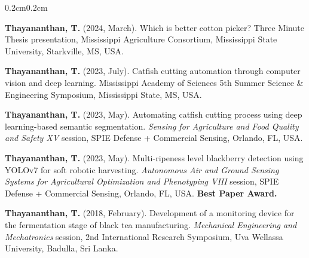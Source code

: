 \documentclass[10pt, letterpaper]{article}
\newcommand{\textbfr}[1]{\textbf{#1}}
\newenvironment{onecolentry}{%
    \begin{adjustwidth}{0.2cm}{0.2cm}
}{\end{adjustwidth}}
\newenvironment{pres}{%
  \begin{enumerate}[label={[P\arabic*]}, leftmargin=1.15cm, labelsep=0.2cm,
                    topsep=0.08cm, parsep=0.08cm, partopsep=0pt, itemsep=0pt]
}{\end{enumerate}}
\begin{document}
\begin{onecolentry}
\begin{pres}
    \item \textbfr{Thayananthan, T.} (2024, March). Which is better cotton picker?
    Three Minute Thesis presentation, Mississippi Agriculture Consortium,
    Mississippi State University, Starkville, MS, USA.

    \item \textbfr{Thayananthan, T.} (2023, July). Catfish cutting automation through
    computer vision and deep learning. Mississippi Academy of Sciences 5th Summer
    Science \& Engineering Symposium, Mississippi State, MS, USA.

    \item \textbfr{Thayananthan, T.} (2023, May). Automating catfish cutting process
    using deep learning-based semantic segmentation. \emph{Sensing for Agriculture
    and Food Quality and Safety XV} session, SPIE Defense + Commercial Sensing,
    Orlando, FL, USA.

    \item \textbfr{Thayananthan, T.} (2023, May). Multi-ripeness level blackberry
    detection using YOLOv7 for soft robotic harvesting. \emph{Autonomous Air and
    Ground Sensing Systems for Agricultural Optimization and Phenotyping VIII}
    session, SPIE Defense + Commercial Sensing, Orlando, FL, USA.
    \textbf{Best Paper Award.}

    \item \textbfr{Thayananthan, T.} (2018, February). Development of a monitoring
    device for the fermentation stage of black tea manufacturing.
    \emph{Mechanical Engineering and Mechatronics} session, 2nd International
    Research Symposium, Uva Wellassa University, Badulla, Sri Lanka.
\end{pres}
\end{onecolentry}
\vspace{0.18cm}

\end{document}
